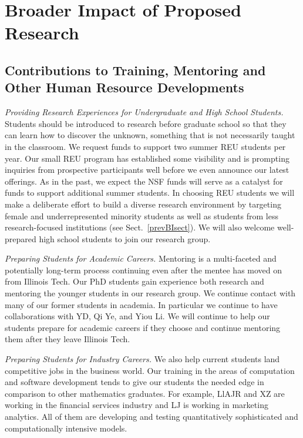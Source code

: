 \documentclass[11pt]{NSFamsart}
\begin{document}
\section{Broader Impact of Proposed Research}\label{SectBroad}


\subsection{Contributions to Training, Mentoring and Other Human Resource Developments}

\emph{Providing Research Experiences for Undergraduate and High School Students.} Students 
should be introduced to research before graduate school so that they can learn how to 
discover the unknown, something that is not necessarily taught in the classroom. We request funds 
to 
support two summer REU students per year.  Our small REU program has established some visibility 
and is prompting inquiries from prospective participants well before we 
even announce our latest 
offerings. As in the past, we expect the NSF funds will serve as a catalyst for funds to 
support additional summer students. In choosing REU students we will make a deliberate effort to 
build 
a diverse research environment by targeting female and underrepresented minority students as well 
as students from less research-focused institutions (see Sect.~\ref{prevBIsect}). We will also 
welcome well-prepared high school students to join our research group.

\emph{Preparing Students for Academic Careers.} Mentoring is a multi-faceted and 
potentially long-term process continuing even after the mentee has moved on from Illinois Tech.  
Our PhD students gain experience both research and mentoring the younger students in our 
research group.  We 
continue contact with many of our former students in academia.  In particular we continue to have 
collaborations with YD, Qi Ye, and Yiou Li.  We will continue to help our students prepare for 
academic careers if they choose and continue mentoring them after they leave Illinois Tech.

\emph{Preparing Students for Industry Careers.}
We also help current students land 
competitive jobs in the business world. Our training in the areas of computation and software 
development tends to give our students the needed edge in comparison to other mathematics 
graduates. For example, LlAJR and XZ are working in the financial services industry and  LJ is 
working in marketing analytics.  All of them are developing and testing quantitatively sophisticated 
and computationally intensive models.
\end{document}
